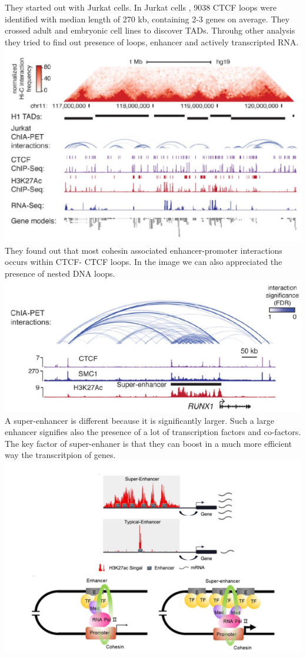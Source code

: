 They started out with Jurkat cells. In Jurkat cells , 9038 CTCF loops were identified with median length of 270 kb, containing 2-3 genes on average. They crossed adult and embryonic cell lines to discover TADs. Throuhg other analysis they tried to find out presence of loops, enhancer and actively transcripted RNA.
\includegraphics{../_resources/efdc44eea9ebe388b5a5a49cf2e3ce6c.png}
They found out that most cohesin associated enhancer-promoter interactions occurs within CTCF-
CTCF loops. In the image we can also appreciated the presence of nested DNA loops.
\includegraphics{../_resources/d0828d655b33d8b7576aed0621665948.png}
A super-enhancer is different because it is significantly larger. Such a large enhancer signifies also the presence of a lot of transcription factors and co-factors. The key factor of super-enhaner is that they can boost in a much more efficient way the transcritpion of genes.
\includegraphics{../_resources/802f178305ca61d2dd78b9be0e2d138b.png}

